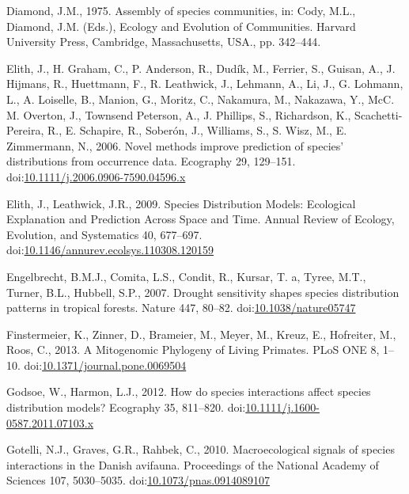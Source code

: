 \hypertarget{ref-Diamond1975}{}
Diamond, J.M., 1975. Assembly of species communities, in: Cody, M.L.,
Diamond, J.M. (Eds.), Ecology and Evolution of Communities. Harvard
University Press, Cambridge, Massachusetts, USA., pp. 342--444.

\hypertarget{ref-Elith2006}{}
Elith, J., H. Graham, C., P. Anderson, R., Dudík, M., Ferrier, S.,
Guisan, A., J. Hijmans, R., Huettmann, F., R. Leathwick, J., Lehmann,
A., Li, J., G. Lohmann, L., A. Loiselle, B., Manion, G., Moritz, C.,
Nakamura, M., Nakazawa, Y., McC. M. Overton, J., Townsend Peterson, A.,
J. Phillips, S., Richardson, K., Scachetti-Pereira, R., E. Schapire, R.,
Soberón, J., Williams, S., S. Wisz, M., E. Zimmermann, N., 2006. Novel
methods improve prediction of species' distributions from occurrence
data. Ecography 29, 129--151.
doi:\href{https://doi.org/10.1111/j.2006.0906-7590.04596.x}{10.1111/j.2006.0906-7590.04596.x}

\hypertarget{ref-Elith2009a}{}
Elith, J., Leathwick, J.R., 2009. Species Distribution Models:
Ecological Explanation and Prediction Across Space and Time. Annual
Review of Ecology, Evolution, and Systematics 40, 677--697.
doi:\href{https://doi.org/10.1146/annurev.ecolsys.110308.120159}{10.1146/annurev.ecolsys.110308.120159}

\hypertarget{ref-Engelbrecht2007}{}
Engelbrecht, B.M.J., Comita, L.S., Condit, R., Kursar, T. a, Tyree,
M.T., Turner, B.L., Hubbell, S.P., 2007. Drought sensitivity shapes
species distribution patterns in tropical forests. Nature 447, 80--82.
doi:\href{https://doi.org/10.1038/nature05747}{10.1038/nature05747}

\hypertarget{ref-Finstermeier2013}{}
Finstermeier, K., Zinner, D., Brameier, M., Meyer, M., Kreuz, E.,
Hofreiter, M., Roos, C., 2013. A Mitogenomic Phylogeny of Living
Primates. PLoS ONE 8, 1--10.
doi:\href{https://doi.org/10.1371/journal.pone.0069504}{10.1371/journal.pone.0069504}

\hypertarget{ref-Godsoe2012}{}
Godsoe, W., Harmon, L.J., 2012. How do species interactions affect
species distribution models? Ecography 35, 811--820.
doi:\href{https://doi.org/10.1111/j.1600-0587.2011.07103.x}{10.1111/j.1600-0587.2011.07103.x}

\hypertarget{ref-Gotelli2010}{}
Gotelli, N.J., Graves, G.R., Rahbek, C., 2010. Macroecological signals
of species interactions in the Danish avifauna. Proceedings of the
National Academy of Sciences 107, 5030--5035.
doi:\href{https://doi.org/10.1073/pnas.0914089107}{10.1073/pnas.0914089107}

